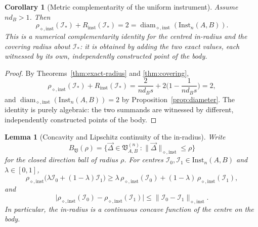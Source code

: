 \documentclass[11pt,a4paper]{article}
\newtheorem{lemma}[theorem]{Lemma}
\newtheorem{corollary}[theorem]{Corollary}
\newcommand{\Inst}{\mathrm{Inst}}
\newcommand{\diam}{\operatorname{diam}}
\newcommand{\vD}{\vec{\Delta}}
\begin{document}
\begin{corollary}[Metric complementarity of the uniform instrument]
\label{cor:complementarity}
Assume $nd_B>1$. Then
\[
\rho_{\diamond,\mathrm{inst}}(\mathcal I_*)+R_{\mathrm{inst}}(\mathcal I_*)
=2=\diam_{\diamond,\mathrm{inst}}(\Inst_n(A,B)).
\]
This is a numerical complementarity identity for the centred in-radius and the covering radius about $\mathcal I_*$: it is obtained by adding the two exact values, each witnessed by its own, independently constructed point of the body.
\end{corollary}

\begin{proof}
By Theorems~\ref{thm:exact-radius} and \ref{thm:covering},
\[
\rho_{\diamond,\mathrm{inst}}(\mathcal I_*)+R_{\mathrm{inst}}(\mathcal I_*)
=\frac{2}{nd_Bs}+2\Big(1-\frac1{nd_Bs}\Big)=2,
\]
and $\diam_{\diamond,\mathrm{inst}}(\Inst_n(A,B))=2$ by Proposition~\ref{prop:diameter}. The identity is purely algebraic: the two summands are witnessed by different, independently constructed points of the body.
\end{proof}

\begin{lemma}[Concavity and Lipschitz continuity of the in-radius]
\label{lem:inradius-concave}
Write
\[
B_{\mathfrak V}(\rho)=\big\{\vD\in\mathfrak V_{A,B}^{(n)}:\|\vD\|_{\diamond,\mathrm{inst}}\le\rho\big\}
\]
for the closed direction ball of radius $\rho$. For centres $\mathcal I_0,\mathcal I_1\in\Inst_n(A,B)$ and $\lambda\in[0,1]$,
\[
\rho_{\diamond,\mathrm{inst}}\big(\lambda\mathcal I_0+(1-\lambda)\mathcal I_1\big)
\ge\lambda\,\rho_{\diamond,\mathrm{inst}}(\mathcal I_0)+(1-\lambda)\,\rho_{\diamond,\mathrm{inst}}(\mathcal I_1),
\]
and
\[
\big|\rho_{\diamond,\mathrm{inst}}(\mathcal I_0)-\rho_{\diamond,\mathrm{inst}}(\mathcal I_1)\big|
\le\|\mathcal I_0-\mathcal I_1\|_{\diamond,\mathrm{inst}}.
\]
In particular, the in-radius is a continuous concave function of the centre on the body.
\end{lemma}
\end{document}
